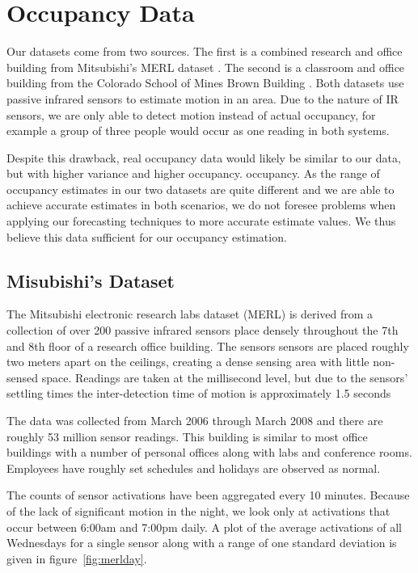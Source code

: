 \documentclass{acm_proc_article-sp}
\begin{document}
\section{Occupancy Data}
 
Our datasets come from two sources.  The first is a combined research and office building from Mitsubishi's MERL dataset \cite{Wren2007}.  The second is a classroom and office building from the Colorado School of Mines Brown Building \cite{Hoff2009}.  Both datasets use passive infrared sensors to estimate motion in an area.  Due to the nature of IR sensors, we are only able to detect motion instead of actual occupancy, for example a group of three people would occur as one reading in both systems.  

Despite this drawback, real occupancy data would likely be similar to our data, but with higher variance and higher occupancy. occupancy.  As the range of occupancy estimates in our two datasets are quite different and we are able to achieve accurate estimates in both scenarios, we do not foresee problems when applying our forecasting techniques to more accurate estimate values.  We thus believe this data sufficient for our occupancy estimation.


\subsection{Misubishi's Dataset} 

The Mitsubishi electronic research labs dataset (MERL) is derived from a collection of over 200 passive infrared sensors place densely throughout the 7th and 8th floor of a research office building.  The sensors sensors are placed roughly two meters apart on the ceilings, creating a dense sensing area with little non-sensed space.  Readings are taken at the millisecond level, but due to the sensors' settling times the inter-detection time of motion is approximately 1.5 seconds

The data was collected from March 2006 through March 2008 and there are roughly 53 million sensor readings.  This building is similar to most office buildings with a number of personal offices along with labs and conference rooms.  Employees have roughly set schedules and holidays are observed as normal. 

The counts of sensor activations have been aggregated every 10 minutes.  Because of the lack of significant motion in the night, we look only at activations that occur between 6:00am and 7:00pm daily.  A plot of the average activations of all Wednesdays for a single sensor along with a range of one standard deviation is given in figure~\ref{fig:merlday}.  
\end{document}
